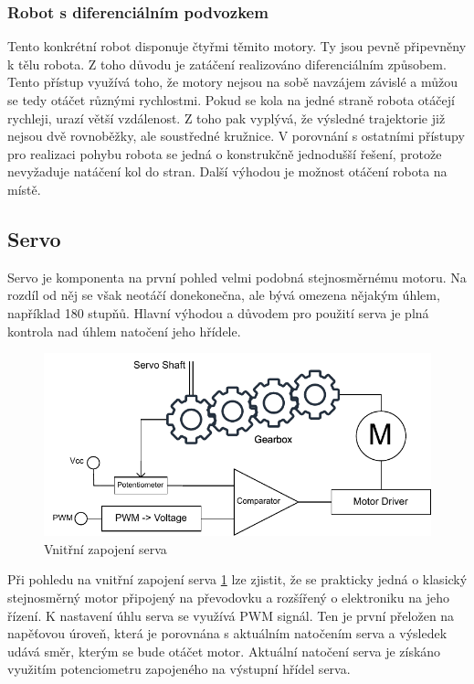 \subsubsection{Robot s diferenciálním podvozkem}
Tento konkrétní robot disponuje čtyřmi těmito motory. Ty jsou pevně připevněny k tělu robota. Z toho důvodu je zatáčení realizováno diferenciálním způsobem. Tento přístup využívá toho, že motory nejsou na sobě navzájem závislé a můžou se tedy otáčet různými rychlostmi. Pokud se kola na jedné straně robota otáčejí rychleji, urazí větší vzdálenost. Z toho pak vyplývá, že výsledné trajektorie již nejsou dvě rovnoběžky, ale soustředné kružnice. V porovnání s ostatními přístupy pro realizaci pohybu robota se jedná o konstrukčně jednodušší řešení, protože nevyžaduje natáčení kol do stran. Další výhodou je možnost otáčení robota na místě.

\subsection*{Servo}
Servo je komponenta na první pohled velmi podobná stejnosměrnému motoru. Na rozdíl od něj se však neotáčí donekonečna, ale bývá omezena nějakým úhlem, například 180 stupňů. Hlavní výhodou a důvodem pro použití serva je plná kontrola nad úhlem natočení jeho hřídele.\cite[str:~119-121]{embeded_robotics}

\begin{figure}[h!]
	\centering
	\includegraphics[scale=0.9]{obrazky-figures/servo.pdf}
	\caption{Vnitřní zapojení serva}
	\label{fig:servo}
\end{figure}

Při pohledu na vnitřní zapojení serva \ref{fig:servo} lze zjistit, že se prakticky jedná o klasický stejnosměrný motor připojený na převodovku a rozšířený o elektroniku na jeho řízení. K nastavení úhlu serva se využívá PWM signál. Ten je první přeložen na napěťovou úroveň, která je porovnána s aktuálním natočením serva a výsledek udává směr, kterým se bude otáčet motor. Aktuální natočení serva je získáno využitím potenciometru zapojeného na výstupní hřídel serva. \cite[str:~89-90]{mobilní_roboty}

